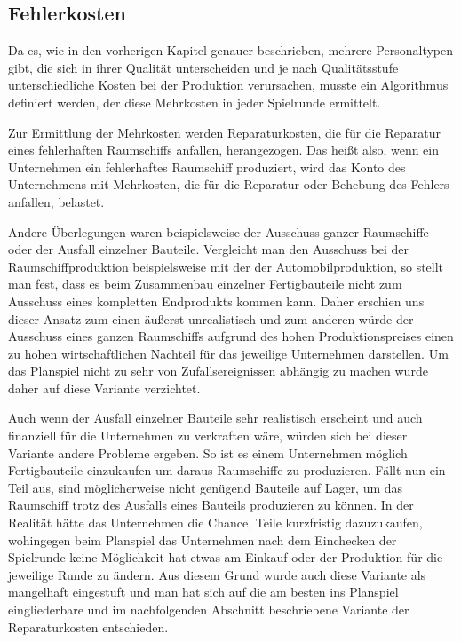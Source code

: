 \subsection{Fehlerkosten}
\label{sub:spielwelt-logik-fehlerkosten}

Da es, wie in den vorherigen Kapitel genauer beschrieben, mehrere Personaltypen gibt,
die sich in ihrer Qualität unterscheiden und je nach Qualitätsstufe unterschiedliche
Kosten bei der Produktion verursachen, musste ein Algorithmus definiert werden, der diese
Mehrkosten in jeder Spielrunde ermittelt.

Zur Ermittlung der Mehrkosten werden Reparaturkosten, die für die Reparatur eines
fehlerhaften Raumschiffs anfallen, herangezogen. Das heißt also, wenn ein Unternehmen
ein fehlerhaftes Raumschiff produziert, wird das Konto des Unternehmens mit Mehrkosten,
die für die Reparatur oder Behebung des Fehlers anfallen, belastet.

Andere Überlegungen waren beispielsweise der Ausschuss ganzer Raumschiffe oder der Ausfall
einzelner Bauteile. Vergleicht man den Ausschuss bei der Raumschiffproduktion beispielsweise
mit der der Automobilproduktion, so stellt man fest, dass es beim Zusammenbau einzelner
Fertigbauteile nicht zum Ausschuss eines kompletten Endprodukts kommen kann. Daher erschien
uns dieser Ansatz zum einen äußerst unrealistisch und zum anderen würde der Ausschuss eines
ganzen Raumschiffs aufgrund des hohen Produktionspreises einen zu hohen wirtschaftlichen Nachteil
für das jeweilige Unternehmen darstellen. Um das Planspiel nicht zu sehr von Zufallsereignissen
abhängig zu machen wurde daher auf diese Variante verzichtet.

Auch wenn der Ausfall einzelner Bauteile sehr realistisch erscheint und auch finanziell für die
Unternehmen zu verkraften wäre, würden sich bei dieser Variante andere Probleme ergeben. So ist es
einem Unternehmen möglich Fertigbauteile einzukaufen um daraus Raumschiffe zu produzieren. Fällt
nun ein Teil aus, sind möglicherweise nicht genügend Bauteile auf Lager, um das Raumschiff trotz
des Ausfalls eines Bauteils produzieren zu können. In der Realität hätte das Unternehmen die Chance,
Teile kurzfristig dazuzukaufen, wohingegen beim Planspiel das Unternehmen nach dem Einchecken der
Spielrunde keine Möglichkeit hat etwas am Einkauf oder der Produktion für die jeweilige Runde zu ändern.
Aus diesem Grund wurde auch diese Variante als mangelhaft eingestuft und man hat sich auf die am besten
ins Planspiel eingliederbare und im nachfolgenden Abschnitt beschriebene Variante der Reparaturkosten
entschieden.

